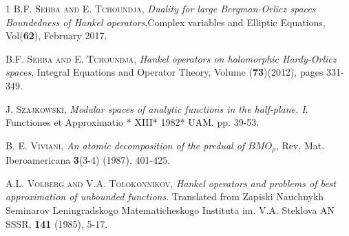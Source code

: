 \documentclass[a4paper,12pt,intlimits,oneside]{amsart}
\theoremstyle{definition}
\numberwithin{equation}{section}
\theoremstyle{definition}
\begin{document}
\begin{thebibliography}{1}
     \textsc{B.F. Sehba and E. Tchoundja}, \emph{Duality for large Bergman-Orlicz spaces Boundedness of Hankel operators},Complex variables and Elliptic Equations, Vol(\textbf{62}), February 2017.


     \textsc{B.F. Sehba and E. Tchoundja}, \emph{Hankel operators on holomorphic Hardy-Orlicz spaces}, Integral Equations and Operator Theory, Volume (\textbf{73})(2012), pages 331-349.



 \textsc{J. Szajkowski,}
  \emph{Modular spaces of analytic functions in the half-plane. I}. Functiones et Approximatio * XIII* 1982* UAM.  pp. 39-53.
  
 
\textsc{B. E. Viviani,}
  \emph{An atomic decomposition of the predual of $BMO_{\rho}$}, Rev. Mat. Iberoamericana \textbf{3}(3-4) (1987), 401-425.
 
 
\textsc{A.L. Volberg and V.A. Tolokonnikov,}
  \emph{Hankel operators and problems of best
  approximation of unbounded functions}. Translated from Zapiski Nauchnykh Seminarov Leningradskogo Matematicheskogo Instituta im. V.A. Steklova AN SSSR, \textbf{141} (1985), 5-17.
  

\end{thebibliography}
\end{document}
